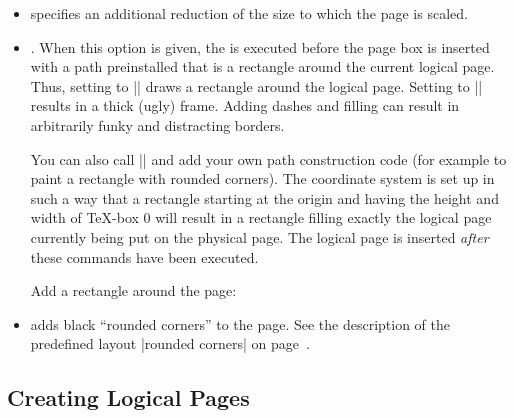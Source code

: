 \begin{command}{\pgfpageslogicalpageoptions{}}
\begin{itemize}
            \example Let logical page 2 show what logical page 1 showed on the
            just-shipped-out physical page:
\begin{codeexample}
\end{codeexample}
        \item {} specifies an additional
            reduction of the size to which the page is scaled.
        \item {}. When this option is given,
            the  is executed before the page box is inserted with a
            path preinstalled that is a rectangle around the current logical
            page. Thus, setting  to || draws a rectangle
            around the logical page. Setting  to
            |\pgfsetlinewidth{3pt}| results in a thick (ugly) frame.
            Adding dashes and filling can result in arbitrarily funky and
            distracting borders.

            You can also call || and add your own path
            construction code (for example to paint a rectangle with rounded
            corners). The coordinate system is  set up in such a way that a
            rectangle starting at the origin and having the height and width of
            \TeX-box 0 will result in a rectangle filling exactly the logical
            page currently being put on the physical page. The logical page is
            inserted \emph{after} these commands have been executed.

            \example Add a rectangle around the page:
\begin{codeexample}
\end{codeexample}
        \item {} adds black ``rounded
            corners'' to the page. See the description of the predefined layout
            |rounded corners| on page~\pageref{layout-rounded-corners}.
    \end{itemize}
\end{command}


\subsection{Creating Logical Pages}

